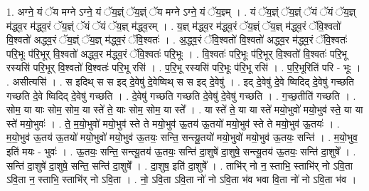\documentclass[17pt]{extarticle}
\begin{document}
1. अग्ने॒ यं ॅय मग्ने ऽग्ने॒ यं ॅय॒ज्ञ्ं ॅय॒ज्ञ्ं ॅय मग्ने ऽग्ने॒ यं ॅय॒ज्ञ्म् । . यं ॅय॒ज्ञ्ं ॅय॒ज्ञ्ं ॅयं ॅयं ॅय॒ज्ञ् म॑द्ध्व॒र म॑द्ध्व॒रं ॅय॒ज्ञ्ं ॅयं ॅयं ॅय॒ज्ञ् म॑द्ध्व॒रम् । . य॒ज्ञ् म॑द्ध्व॒र म॑द्ध्व॒रं ॅय॒ज्ञ्ं ॅय॒ज्ञ् म॑द्ध्व॒रं ॅवि॒श्वतो॑ वि॒श्वतो॑ अद्ध्व॒रं ॅय॒ज्ञ्ं ॅय॒ज्ञ् म॑द्ध्व॒रं ॅवि॒श्वतः॑ । . अ॒द्ध्व॒रं ॅवि॒श्वतो॑ वि॒श्वतो॑ अद्ध्व॒र म॑द्ध्व॒रं ॅवि॒श्वतः॑ परि॒भूः प॑रि॒भूर् वि॒श्वतो॑ अद्ध्व॒र म॑द्ध्व॒रं ॅवि॒श्वतः॑ परि॒भूः । . वि॒श्वतः॑ परि॒भूः प॑रि॒भूर् वि॒श्वतो॑ वि॒श्वतः॑ परि॒भू रस्यसि॑ परि॒भूर् वि॒श्वतो॑ वि॒श्वतः॑ परि॒भू रसि॑ । . प॒रि॒भू रस्यसि॑ परि॒भूः प॑रि॒भू रसि॑ । . प॒रि॒भूरिति॑ परि - भूः । . असीत्यसि॑ । . स इदिथ् स स इद् दे॒वेषु॑ दे॒वेष्विथ् स स इद् दे॒वेषु॑ । . इद् दे॒वेषु॑ दे॒वे ष्विदिद् दे॒वेषु॑ गच्छति गच्छति दे॒वे ष्विदिद् दे॒वेषु॑ गच्छति । . दे॒वेषु॑ गच्छति गच्छति दे॒वेषु॑ दे॒वेषु॑ गच्छति । . ग॒च्छ॒तीति॑ गच्छति । . सोम॒ या याः सोम॒ सोम॒ या स्ते॑ ते॒ याः सोम॒ सोम॒ या स्ते᳚ । . या स्ते॑ ते॒ या या स्ते॑ मयो॒भुवो॑ मयो॒भुव॑ स्ते॒ या या स्ते॑ मयो॒भुवः॑ । . ते॒ म॒यो॒भुवो॑ मयो॒भुव॑ स्ते ते मयो॒भुव॑ ऊ॒तय॑ ऊ॒तयो॑ मयो॒भुव॑ स्ते ते मयो॒भुव॑ ऊ॒तयः॑ । . म॒यो॒भुव॑ ऊ॒तय॑ ऊ॒तयो॑ मयो॒भुवो॑ मयो॒भुव॑ ऊ॒तयः॒ सन्ति॒ सन्त्यू॒तयो॑ मयो॒भुवो॑ मयो॒भुव॑ ऊ॒तयः॒ सन्ति॑ । . म॒यो॒भुव॒ इति॑ मयः - भुवः॑ । . ऊ॒तयः॒ सन्ति॒ सन्त्यू॒तय॑ ऊ॒तयः॒ सन्ति॑ दा॒शुषे॑ दा॒शुषे॒ सन्त्यू॒तय॑ ऊ॒तयः॒ सन्ति॑ दा॒शुषे᳚ । . सन्ति॑ दा॒शुषे॑ दा॒शुषे॒ सन्ति॒ सन्ति॑ दा॒शुषे᳚ । . दा॒शुष॒ इति॑ दा॒शुषे᳚ । . ताभि॑र् नो न॒ स्ताभि॒ स्ताभि॑र् नो ऽवि॒ता ऽवि॒ता न॒ स्ताभि॒ स्ताभि॑र् नो ऽवि॒ता । . नो॒ ऽवि॒ता ऽवि॒ता नो॑ नो ऽवि॒ता भ॑व भवा वि॒ता नो॑ नो ऽवि॒ता भ॑व । \newline
\end{document}
